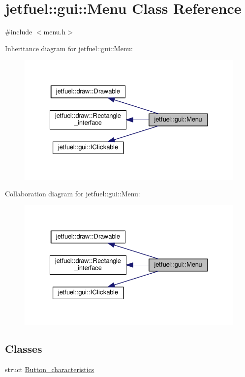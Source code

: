 \hypertarget{classjetfuel_1_1gui_1_1Menu}{}\section{jetfuel\+:\+:gui\+:\+:Menu Class Reference}
\label{classjetfuel_1_1gui_1_1Menu}


{\ttfamily \#include $<$menu.\+h$>$}



Inheritance diagram for jetfuel\+:\+:gui\+:\+:Menu\+:
\nopagebreak
\begin{figure}[H]
\begin{center}
\leavevmode
\includegraphics[width=328pt]{classjetfuel_1_1gui_1_1Menu__inherit__graph}
\end{center}
\end{figure}


Collaboration diagram for jetfuel\+:\+:gui\+:\+:Menu\+:
\nopagebreak
\begin{figure}[H]
\begin{center}
\leavevmode
\includegraphics[width=328pt]{classjetfuel_1_1gui_1_1Menu__coll__graph}
\end{center}
\end{figure}
\subsection*{Classes}
\begin{DoxyCompactItemize}
\item 
struct \hyperlink{structjetfuel_1_1gui_1_1Menu_1_1Button__characteristics}{Button\+\_\+characteristics}
\end{DoxyCompactItemize}
